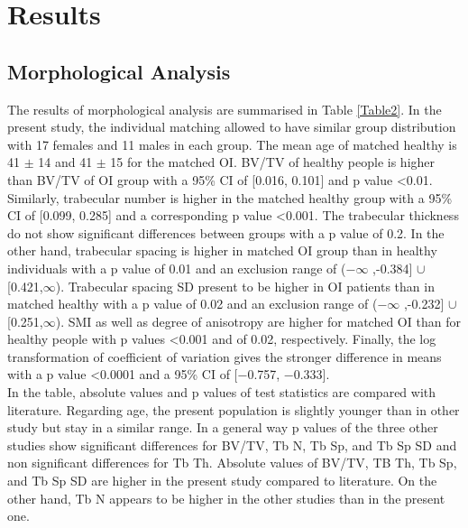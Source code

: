\documentclass[a4paper,fleqn]{DC_ArtStyle}
\begin{document}
\section{Results}

\subsection{Morphological Analysis}
The results of morphological analysis are summarised in Table \ref{Table2}. In the present study, the individual matching allowed to have similar group distribution with 17 females and 11 males in each group. The mean age of matched healthy is 41 $\pm$ 14 and 41 $\pm$ 15 for the matched OI. BV/TV of healthy people is higher than BV/TV of OI group with a 95\% CI of [0.016, 0.101] and p value <0.01. Similarly, trabecular number is higher in the matched healthy group with a 95\% CI of [0.099, 0.285] and a corresponding p value <0.001. The trabecular thickness do not show significant differences between groups with a p value of 0.2. In the other hand, trabecular spacing is higher in matched OI group than in healthy individuals with a p value of 0.01 and an exclusion range of ($-\infty$ ,-0.384] $\cup$ [0.421,$\infty$). Trabecular spacing SD present to be higher in OI patients than in matched healthy with a p value of 0.02 and an exclusion range of ($-\infty$ ,-0.232] $\cup$ [0.251,$\infty$). SMI as well as degree of anisotropy are higher for matched OI than for healthy people with p values <0.001 and of 0.02, respectively. Finally, the log transformation of coefficient of variation gives the stronger difference in means with a p value <0.0001 and a 95\% CI of [−0.757, −0.333].\\

In the table, absolute values and p values of test statistics are compared with literature. Regarding age, the present population is slightly younger than in other study but stay in a similar range. In a general way p values of the three other studies show significant differences for BV/TV, Tb N, Tb Sp, and Tb Sp SD and non significant differences for Tb Th. Absolute values of BV/TV, TB Th, Tb Sp, and Tb Sp SD are higher in the present study compared to literature. On the other hand, Tb N appears to be higher in the other studies than in the present one.
\end{document}
